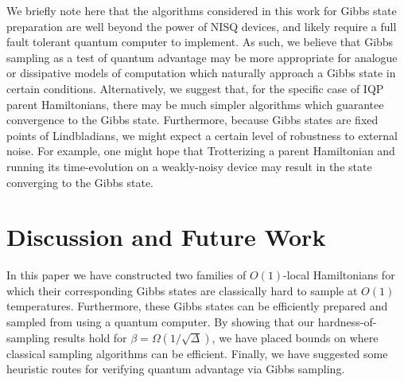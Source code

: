 \documentclass[a4paper,onecolumn,11pt,accepted=2017-05-09]{quantumarticle}
\begin{document}
We briefly note here that the algorithms considered in this work for Gibbs state preparation are well beyond the power of NISQ devices, and likely require a full fault tolerant quantum computer to implement.
As such, we believe that Gibbs sampling as a test of quantum advantage may be more appropriate for analogue or dissipative models of computation which naturally approach a Gibbs state in certain conditions. 
Alternatively, we suggest that, for the specific case of IQP parent Hamiltonians, there may be much simpler algorithms which guarantee convergence to the Gibbs state.
Furthermore, because Gibbs states are fixed points of Lindbladians, we might expect a certain level of robustness to external noise.
For example, one might hope that Trotterizing a parent Hamiltonian and running its time-evolution on a weakly-noisy device may result in the state converging to the Gibbs state.
 
\section{Discussion and Future Work}
\label{Sec:Discussion}

In this paper we have constructed two families of $O(1)$-local Hamiltonians for which their corresponding Gibbs states are classically hard to sample at $O(1)$ temperatures.
Furthermore, these Gibbs states can be efficiently prepared and sampled from using a quantum computer.
By showing that our hardness-of-sampling results hold for $\beta = \Omega(1/\sqrt{\Delta})$, we have placed bounds on where classical sampling algorithms can be efficient.
Finally, we have suggested some heuristic routes for verifying quantum advantage via Gibbs sampling.
\end{document}
